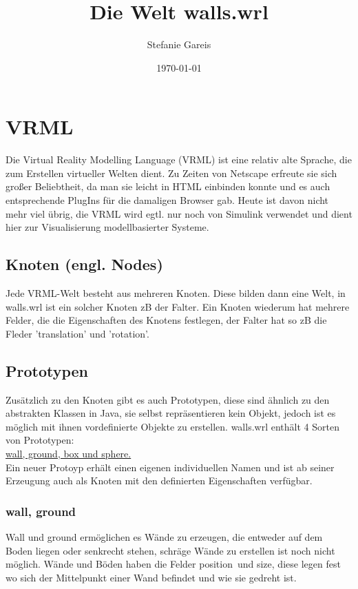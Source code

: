 \documentclass[titlepage]{article}
\author{Stefanie Gareis}
\title{Die Welt walls.wrl}
\date{\today}
\begin{document}
\maketitle
{}
\tableofcontents
\newpage
{}
\setcounter{page}{1}

\section{VRML}
Die Virtual Reality Modelling Language (VRML) ist eine relativ alte Sprache, die zum Erstellen virtueller Welten dient. Zu Zeiten von Netscape erfreute sie sich großer Beliebtheit, da man sie leicht in HTML einbinden konnte und es auch entsprechende PlugIns für die damaligen Browser gab. Heute ist davon nicht mehr viel übrig, die VRML wird egtl. nur noch von Simulink verwendet und dient hier zur Visualisierung modellbasierter Systeme.
\subsection{Knoten (engl. Nodes)}
Jede VRML-Welt besteht aus mehreren Knoten. Diese bilden dann eine Welt, in walls.wrl ist ein solcher Knoten zB der Falter. Ein Knoten wiederum hat mehrere Felder, die die Eigenschaften des Knotens festlegen, der Falter hat so zB die Fleder 'translation' und 'rotation'.
\subsection{Prototypen}
Zusätzlich zu den Knoten gibt es auch Prototypen, diese sind ähnlich zu den abstrakten Klassen in Java, sie selbst repräsentieren kein Objekt, jedoch ist es möglich mit ihnen vordefinierte Objekte zu erstellen. walls.wrl enthält 4 Sorten von Prototypen:\\
\underline{wall, ground, box und sphere.}\\
Ein neuer Protoyp erhält einen eigenen individuellen Namen und ist ab seiner Erzeugung auch als Knoten mit den definierten Eigenschaften verfügbar.
\subsubsection{wall, ground}
Wall und ground ermöglichen es Wände zu erzeugen, die entweder auf dem Boden liegen oder senkrecht stehen, schräge Wände zu erstellen ist noch nicht möglich. Wände und Böden haben die Felder \glqq position\grqq \ und \glqq size\grqq, diese legen fest wo sich der Mittelpunkt einer Wand befindet und wie sie gedreht ist.
\end{document}
